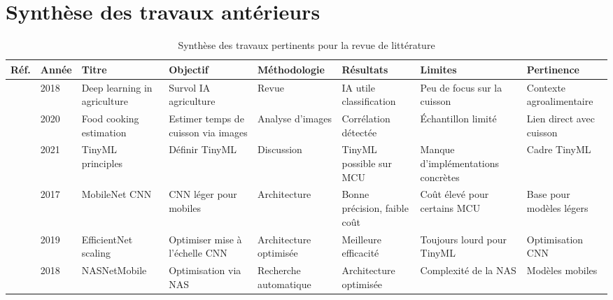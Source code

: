 \section{Synthèse des travaux antérieurs}
\begin{table}[H]
    \centering
    \scriptsize
    \caption{Synthèse des travaux pertinents pour la revue de littérature}
    \label{tab:revue_litterature}
    \begin{tabularx}{\textwidth}{|p{0.5cm}|p{0.7cm}|p{2.0cm}|X|X|X|X|X|}
        \hline
        \textbf{Réf.}                & \textbf{Année} & \textbf{Titre}               & \textbf{Objectif}                & \textbf{Méthodologie}       & \textbf{Résultats}           & \textbf{Limites}                & \textbf{Pertinence}              \\
        \hline
        \cite{kamilaris2018}         & 2018           & Deep learning in agriculture & Survol IA agriculture            & Revue                       & IA utile classification      & Peu de focus sur la cuisson    & Contexte agroalimentaire         \\
        \hline
        \cite{rahman2020}            & 2020           & Food cooking estimation      & Estimer temps de cuisson via images & Analyse d’images         & Corrélation détectée         & Échantillon limité              & Lien direct avec cuisson        \\
        \hline
        \cite{banbury2021micronets}  & 2021           & TinyML principles            & Définir TinyML                   & Discussion                  & TinyML possible sur MCU       & Manque d’implémentations concrètes & Cadre TinyML                   \\
        \hline
        \cite{howard2017mobilenets}  & 2017           & MobileNet CNN                & CNN léger pour mobiles           & Architecture                & Bonne précision, faible coût  & Coût élevé pour certains MCU    & Base pour modèles légers        \\
        \hline
        \cite{tan2019mnasnet}        & 2019           & EfficientNet scaling         & Optimiser mise à l’échelle CNN   & Architecture optimisée      & Meilleure efficacité         & Toujours lourd pour TinyML      & Optimisation CNN                \\
        \hline
        \cite{zoph2018}              & 2018           & NASNetMobile                 & Optimisation via NAS             & Recherche automatique       & Architecture optimisée       & Complexité de la NAS            & Modèles mobiles                \\

\end{tabularx}
\end{table}
